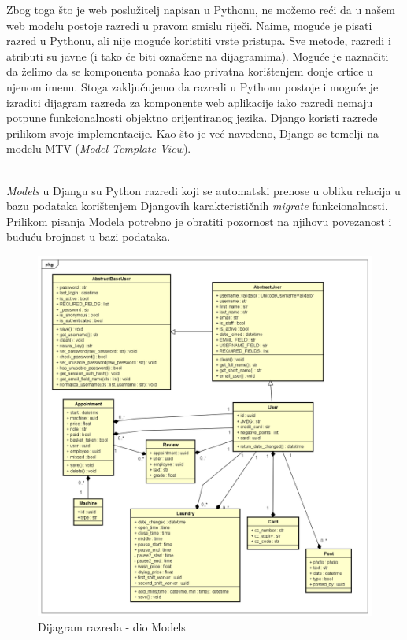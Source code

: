 			Zbog toga što je web poslužitelj napisan u Pythonu, ne možemo reći da u našem web modelu postoje razredi u pravom smislu riječi. Naime, moguće je pisati razred u Pythonu, ali nije moguće koristiti vrste pristupa. Sve metode, razredi i atributi su javne (i tako će biti označene na dijagramima). Moguće je naznačiti da želimo da se komponenta ponaša kao privatna korištenjem donje crtice u njenom imenu. Stoga zaključujemo da razredi u Pythonu postoje i moguće je izraditi dijagram razreda za komponente web aplikacije iako razredi nemaju potpune funkcionalnosti objektno orijentiranog jezika. Django koristi razrede prilikom svoje implementacije. Kao što je već navedeno, Django se temelji na modelu MTV (\emph{Model-Template-View}).\\\
			
			\pagebreak
			\emph{Models} u Djangu su Python razredi koji se automatski prenose u obliku relacija u bazu podataka korištenjem Djangovih karakterističnih \emph {migrate} funkcionalnosti.  Prilikom pisanja Modela potrebno je obratiti pozornost na njihovu povezanost i buduću brojnost u bazi podataka. 	
			\begin{figure}[H]
				\includegraphics[scale=0.50]{slike/Razredni_dijagrami_Models.PNG} 
				\centering
				\caption{Dijagram razreda - dio Models}
				\label{fig:promjene}
			\end{figure}
		
